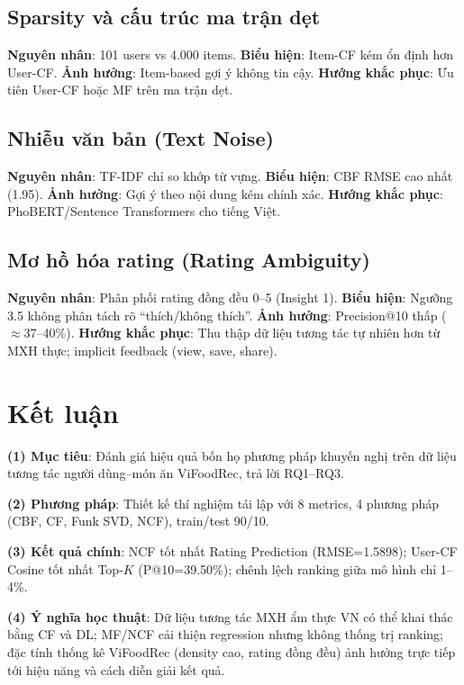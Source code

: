 \documentclass[11pt]{article}
\begin{document}
\subsection{Sparsity và cấu trúc ma trận dẹt}
\textbf{Nguyên nhân}: 101 users vs 4.000 items. \textbf{Biểu hiện}: Item-CF kém ổn định hơn User-CF. \textbf{Ảnh hưởng}: Item-based gợi ý không tin cậy. \textbf{Hướng khắc phục}: Ưu tiên User-CF hoặc MF trên ma trận dẹt.

\subsection{Nhiễu văn bản (Text Noise)}
\textbf{Nguyên nhân}: TF-IDF chỉ so khớp từ vựng. \textbf{Biểu hiện}: CBF RMSE cao nhất (1.95). \textbf{Ảnh hưởng}: Gợi ý theo nội dung kém chính xác. \textbf{Hướng khắc phục}: PhoBERT/Sentence Transformers cho tiếng Việt.

\subsection{Mơ hồ hóa rating (Rating Ambiguity)}
\textbf{Nguyên nhân}: Phân phối rating đồng đều 0--5 (Insight 1). \textbf{Biểu hiện}: Ngưỡng 3.5 không phân tách rõ ``thích/không thích''. \textbf{Ảnh hưởng}: Precision@10 thấp ($\approx$37--40\%). \textbf{Hướng khắc phục}: Thu thập dữ liệu tương tác tự nhiên hơn từ MXH thực; implicit feedback (view, save, share).

\section{Kết luận}
\label{sec:conclusion}

\textbf{(1) Mục tiêu}: Đánh giá hiệu quả bốn họ phương pháp khuyến nghị trên dữ liệu tương tác người dùng--món ăn ViFoodRec, trả lời RQ1--RQ3.

\textbf{(2) Phương pháp}: Thiết kế thí nghiệm tái lập với 8 metrics, 4 phương pháp (CBF, CF, Funk SVD, NCF), train/test 90/10.

\textbf{(3) Kết quả chính}: NCF tốt nhất Rating Prediction (RMSE=1.5898); User-CF Cosine tốt nhất Top-$K$ (P@10=39.50\%); chênh lệch ranking giữa mô hình chỉ 1--4\%.

\textbf{(4) Ý nghĩa học thuật}: Dữ liệu tương tác MXH ẩm thực VN có thể khai thác bằng CF và DL; MF/NCF cải thiện regression nhưng không thống trị ranking; đặc tính thống kê ViFoodRec (density cao, rating đồng đều) ảnh hưởng trực tiếp tới hiệu năng và cách diễn giải kết quả.
\end{document}
